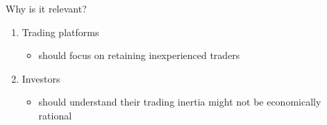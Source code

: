 \documentclass{beamer}
\begin{document}
\begin{frame}{Why is it relevant?}
	
	\begin{enumerate}
		\item{Trading platforms}
		\begin{itemize}
			\item should focus on retaining inexperienced traders
		\end{itemize}

		\item{Investors}
		\begin{itemize}
			\item should understand their trading inertia might not be economically rational
		\end{itemize}
	\end{enumerate}
	

\end{frame}
\end{document}
